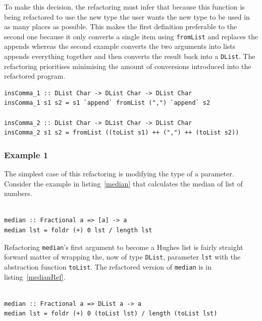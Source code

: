 To make this decision, the refactoring must infer that because this function is being refactored to use the new type the user wants the new type to be used in as many places as possible. This makes the first definition preferable to the second one because it only converts a single item using \texttt{fromList} and replaces the appends whereas the second example converts the two arguments into lists appends everything together and then converts the result back into a \texttt{DList}. The refactoring prioritises minimising the amount of conversions introduced into the refactored program.

\begin{lstlisting}[label=commaRef,caption={Two possible refactorings for \texttt{insComma}}]
insComma_1 :: DList Char -> DList Char -> DList Char
insComma_1 s1 s2 = s1 `append` fromList (",") `append` s2

insComma_2 :: DList Char -> DList Char -> DList Char
insComma_2 s1 s2 = fromList ((toList s1) ++ (",") ++ (toList s2))
\end{lstlisting}

\subsubsection{Example 1}

The simplest case of this refactoring is modifying the type of a parameter. Consider the example in listing~\ref{median} that calculates the median of list of numbers. 

\begin{lstlisting}[caption={Calculating a median}, label=median]

median :: Fractional a => [a] -> a
median lst = foldr (+) 0 lst / length lst

\end{lstlisting} 

Refactoring \texttt{median}'s first argument to become a Hughes list is fairly straight forward matter of wrapping the, now of type \texttt{DList}, parameter \texttt{lst} with the abstraction function \texttt{toList}. The refactored version of \texttt{median} is in listing~\ref{medianRef}. 

\begin{lstlisting}[caption={\texttt{median} refactored}, label=medianRef]

median :: Fractional a => DList a -> a
median lst = foldr (+) 0 (toList lst) / length (toList lst)

\end{lstlisting}    

